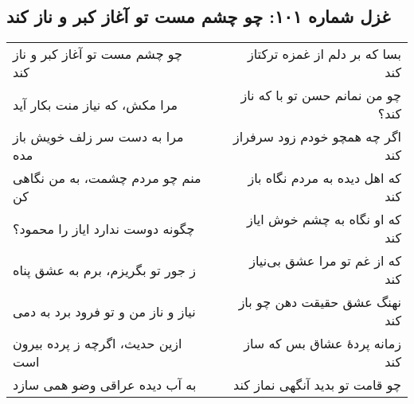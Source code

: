 \begin{center}
\section*{غزل شماره ۱۰۱: چو چشم مست تو آغاز کبر و ناز کند}
\label{sec:101}
\begin{longtable}{l p{0.5cm} r}
چو چشم مست تو آغاز کبر و ناز کند
&&
بسا که بر دلم از غمزه ترکتاز کند
\\
مرا مکش، که نیاز منت بکار آید
&&
چو من نمانم حسن تو با که ناز کند؟
\\
مرا به دست سر زلف خویش باز مده
&&
اگر چه همچو خودم زود سرفراز کند
\\
منم چو مردم چشمت، به من نگاهی کن
&&
که اهل دیده به مردم نگاه باز کند
\\
چگونه دوست ندارد ایاز را محمود؟
&&
که او نگاه به چشم خوش ایاز کند
\\
ز جور تو بگریزم، برم به عشق پناه
&&
که از غم تو مرا عشق بی‌نیاز کند
\\
نیاز و ناز من و تو فرود برد به دمی
&&
نهنگ عشق حقیقت دهن چو باز کند
\\
ازین حدیث، اگرچه ز پرده بیرون است
&&
زمانه پردهٔ عشاق بس که ساز کند
\\
به آب دیده عراقی وضو همی سازد
&&
چو قامت تو بدید آنگهی نماز کند
\\
\end{longtable}
\end{center}
